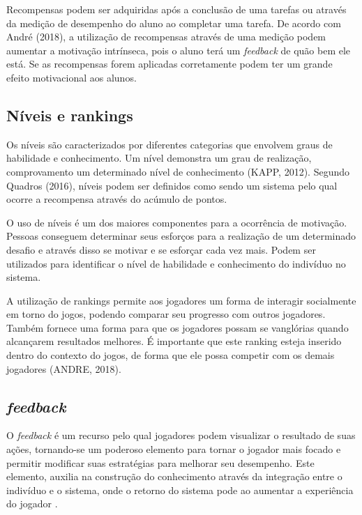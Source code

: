 \documentclass[
	12pt,				%
	oneside,			%
	a4paper,			%
	english,			%
	french,				%
	spanish,			%
	brazil,				%
	]{abntex2}
\begin{document}
Recompensas podem ser adquiridas após a conclusão de uma tarefas ou através da medição de desempenho do aluno ao completar uma tarefa. De acordo com André (2018), a utilização de recompensas através de uma medição podem aumentar a motivação intrínseca, pois o aluno terá um \textit{feedback} de quão bem ele está. Se as recompensas forem aplicadas corretamente podem ter um grande efeito motivacional aos alunos.
    
\subsection{Níveis e rankings}        

Os níveis são caracterizados por diferentes categorias que envolvem graus de habilidade e conhecimento. Um nível demonstra um grau de realização, comprovamento um determinado nível de conhecimento (KAPP, 2012). Segundo Quadros (2016), níveis podem ser definidos como sendo um sistema pelo qual ocorre a recompensa através do acúmulo de pontos.

O uso de níveis é um dos maiores componentes para a ocorrência de motivação. Pessoas conseguem determinar seus esforços para a realização de um determinado desafio e através disso se motivar e se esforçar cada vez mais. Podem ser utilizados para identificar o nível de habilidade e conhecimento do indivíduo no sistema.

A utilização de rankings permite aos jogadores um forma de interagir socialmente em torno do jogos, podendo comparar seu progresso com outros jogadores. Também fornece uma forma para que os jogadores possam se vanglórias quando alcançarem resultados melhores. É importante que este ranking esteja inserido dentro do contexto do jogos, de forma que ele possa competir com os demais jogadores (ANDRE, 2018).
    
\subsection{\textit{feedback}}            

O \textit{feedback} é um recurso pelo qual jogadores podem visualizar o resultado de suas ações, tornando-se um poderoso elemento para tornar o jogador mais focado e permitir modificar suas estratégias para melhorar seu desempenho. Este elemento, auxilia na construção do conhecimento através da integração entre o indivíduo e o sistema, onde o retorno do sistema pode ao aumentar a experiência do jogador \cite{fardo2013gamificaccao}.
    
\end{document}
